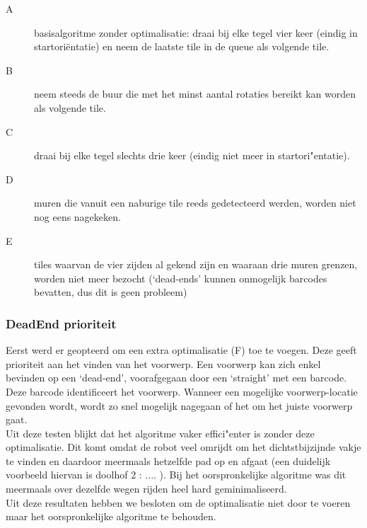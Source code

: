 \documentclass[tt2]{penoverslag}
\begin{document}
\begin{description}
\item[A] basisalgoritme zonder optimalisatie: draai bij elke tegel vier keer (eindig in startori\"entatie) en neem de laatste tile in de queue als volgende tile.
\item[B] neem steeds de buur die met het minst aantal rotaties bereikt kan worden als volgende tile.
\item[C] draai bij elke tegel slechts drie keer (eindig niet meer in startori"entatie).
\item[D] muren die vanuit een naburige tile reeds gedetecteerd werden, worden niet nog eens nagekeken.
\item[E] tiles waarvan de vier zijden al gekend zijn en waaraan drie muren grenzen, worden niet meer bezocht (`dead-ends' kunnen onmogelijk barcodes bevatten, dus dit is geen probleem)
\end{description}


\subsubsection{DeadEnd prioriteit}

Eerst werd er geopteerd om een extra optimalisatie (F) toe te voegen. Deze geeft prioriteit aan het vinden van het voorwerp. Een voorwerp kan zich enkel bevinden op een `dead-end', voorafgegaan door een `straight' met een barcode. Deze barcode identificeert het voorwerp. Wanneer een mogelijke voorwerp-locatie gevonden wordt, wordt zo snel mogelijk nagegaan of het om het juiste voorwerp gaat. \\



Uit deze testen blijkt dat het algoritme vaker effici"enter is zonder deze optimalisatie. Dit komt omdat de robot veel omrijdt om het dichtstbijzijnde vakje te vinden en daardoor meermaals hetzelfde pad op en afgaat (een duidelijk voorbeeld hiervan is doolhof 2 : .... %
 ). Bij het oorspronkelijke algoritme was dit meermaals over dezelfde wegen rijden heel hard geminimaliseerd.\\
 

Uit deze resultaten hebben we besloten om de optimalisatie niet door te voeren maar het oorspronkelijke algoritme te behouden.\\

%
\end{document}

